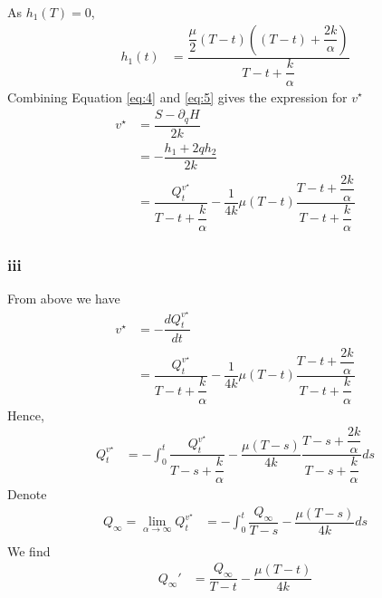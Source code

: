\documentclass{article}
\begin{document}
As $h_{1}(T) = 0$,
\begin{equation}
    \begin{split}
     h_{1}(t)&= \dfrac{\dfrac{\mu}{2}(T-t) ((T-t) +\dfrac{2k}{\alpha} )}{T-t+\dfrac{k}{\alpha}} \label{eq:5}
    \end{split}
\end{equation}
Combining Equation \eqref{eq:4} and \eqref{eq:5} gives the expression for $v^{\star}$\\
\begin{equation*}
    \begin{split}
     v^{\star} & = \dfrac{S - \partial_{q}H}{2k}\\
     &=-\dfrac{h_{1} + 2qh_{2}}{2k}\\
     &= \dfrac{Q_{t}^{v^{\star}}}{T-t+\dfrac{k}{\alpha}} - \dfrac{1}{4k}\mu (T-t)\dfrac{T-t+\dfrac{2k}{\alpha}}{T-t+\dfrac{k}{\alpha}}
    \end{split}
\end{equation*}

\subsubsection*{iii}
From above we have
\begin{equation*}
    \begin{split}
     v^{\star} & = -\dfrac{dQ_{t}^{v^{\star}}}{dt}\\
     &= \dfrac{Q_{t}^{v^{\star}}}{T-t+\dfrac{k}{\alpha}} - \dfrac{1}{4k}\mu (T-t)\dfrac{T-t+\dfrac{2k}{\alpha}}{T-t+\dfrac{k}{\alpha}}
    \end{split}
\end{equation*}
Hence,
\begin{equation*}
    \begin{split}
     Q_{t}^{v^{\star}} &= - \int_{0}^{t} \dfrac{Q_{t}^{v^{\star}}}{T-s+\dfrac{k}{\alpha}} - \dfrac{\mu(T-s)}{4k}\dfrac{T-s+\dfrac{2k}{\alpha}}{T-s+\dfrac{k}{\alpha}} ds
    \end{split}
\end{equation*}
Denote 
\begin{equation*}
    \begin{split}
     Q_{\infty} = \lim_{\alpha \to \infty}Q_{t}^{v^{\star}} &= -  \int_{0}^{t} \dfrac{Q_{\infty}}{T-s} - \dfrac{\mu(T-s)}{4k} ds\\
    \end{split}
\end{equation*}
We find 
\begin{equation*}
    \begin{split}
        Q_{\infty}' &= \dfrac{Q_{\infty}}{T-t} - \dfrac{\mu(T-t)}{4k}
    \end{split}
\end{equation*}
\end{document}
